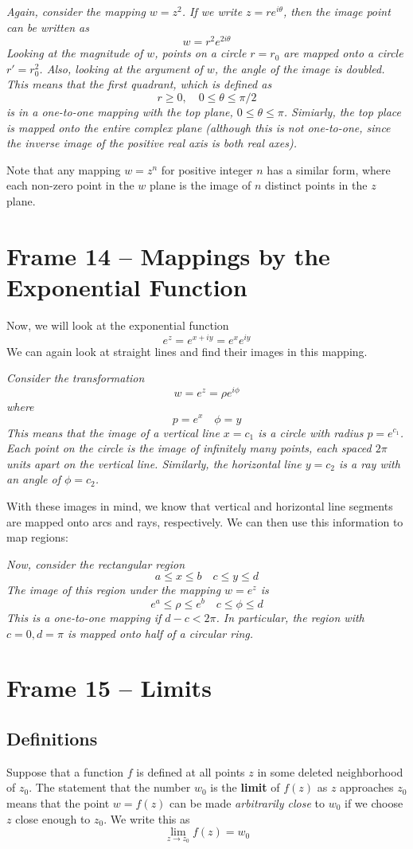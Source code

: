 \documentclass{article}
\renewcommand{\emph}{\textbf}
\begin{document}
\textit{Again, consider the mapping $w = z^2$. If we write $z = re^{i\theta}$, then the image point can be written as
\[
	w = r^2 e^{2i\theta}
\]
Looking at the magnitude of $w$, points on a circle $r = r_0$ are mapped onto a circle $r' = r_0^2$. Also, looking at the argument of $w$, the angle of the image is doubled. This means that the first quadrant, which is defined as
\[
	r \ge 0, \quad 0 \le \theta \le \pi/2
\]
is in a one-to-one mapping with the top plane, $0 \le \theta \le \pi$. Simiarly, the top place is mapped onto the entire complex plane (although this is not one-to-one, since the inverse image of the positive real axis is both real axes).}

Note that any mapping $w = z^n$ for positive integer $n$ has a similar form, where each non-zero point in the $w$ plane is the image of $n$ distinct points in the $z$ plane.


\clearpage
\section{Frame 14 -- Mappings by the Exponential Function}
Now, we will look at the exponential function
\[
	e^z = e^{x + iy} = e^x e^{iy}
\]
We can again look at straight lines and find their images in this mapping.

\textit{Consider the transformation
\[
	w = e^z = \rho e^{i\phi}
\]
where
\[
	p = e^x \quad \phi = y
\]
This means that the image of a vertical line $x = c_1$ is a circle with radius $p = e^{c_1}$. Each point on the circle is the image of infinitely many points, each spaced $2\pi$ units apart on the vertical line. Similarly, the horizontal line $y = c_2$ is a ray with an angle of $\phi = c_2$.}

With these images in mind, we know that vertical and horizontal line segments are mapped onto arcs and rays, respectively. We can then use this information to map regions:

\textit{Now, consider the rectangular region
\[
	a \le x \le b	\quad	c \le y \le d
\]
The image of this region under the mapping $w = e^z$ is
\[
	e^a \le \rho \le e^b	\quad	c \le \phi \le d
\]
This is a one-to-one mapping if $d - c < 2\pi$. In particular, the region with $c = 0, d = \pi$ is mapped onto half of a circular ring.}


\clearpage
\section{Frame 15 -- Limits}
\subsection{Definitions}
Suppose that a function $f$ is defined at all points $z$ in some deleted neighborhood of $z_0$. The statement that the number $w_0$ is the \emph{limit} of $f(z)$ as $z$ approaches $z_0$ means that the point $w = f(z)$ can be made \textit{arbitrarily close} to $w_0$ if we choose $z$ close enough to $z_0$. We write this as
\[
	\lim_{z \to z_0} f(z) = w_0
\]
\end{document}
